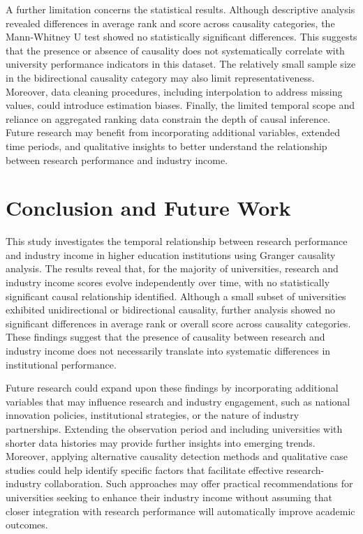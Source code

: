 \documentclass[a4paper, conference]{IEEEtran}
\begin{document}
A further limitation concerns the statistical results. Although descriptive analysis revealed differences in average rank and score across causality categories, the Mann-Whitney U test showed no statistically significant differences. This suggests that the presence or absence of causality does not systematically correlate with university performance indicators in this dataset. The relatively small sample size in the bidirectional causality category may also limit representativeness. Moreover, data cleaning procedures, including interpolation to address missing values, could introduce estimation biases. Finally, the limited temporal scope and reliance on aggregated ranking data constrain the depth of causal inference. Future research may benefit from incorporating additional variables, extended time periods, and qualitative insights to better understand the relationship between research performance and industry income.



\section{Conclusion and Future Work}
\label{sec:conclusion_and_future_work}

This study investigates the temporal relationship between research performance and industry income in higher education institutions using Granger causality analysis. The results reveal that, for the majority of universities, research and industry income scores evolve independently over time, with no statistically significant causal relationship identified. Although a small subset of universities exhibited unidirectional or bidirectional causality, further analysis showed no significant differences in average rank or overall score across causality categories. These findings suggest that the presence of causality between research and industry income does not necessarily translate into systematic differences in institutional performance.

Future research could expand upon these findings by incorporating additional variables that may influence research and industry engagement, such as national innovation policies, institutional strategies, or the nature of industry partnerships. Extending the observation period and including universities with shorter data histories may provide further insights into emerging trends. Moreover, applying alternative causality detection methods and qualitative case studies could help identify specific factors that facilitate effective research-industry collaboration. Such approaches may offer practical recommendations for universities seeking to enhance their industry income without assuming that closer integration with research performance will automatically improve academic outcomes.
\end{document}
